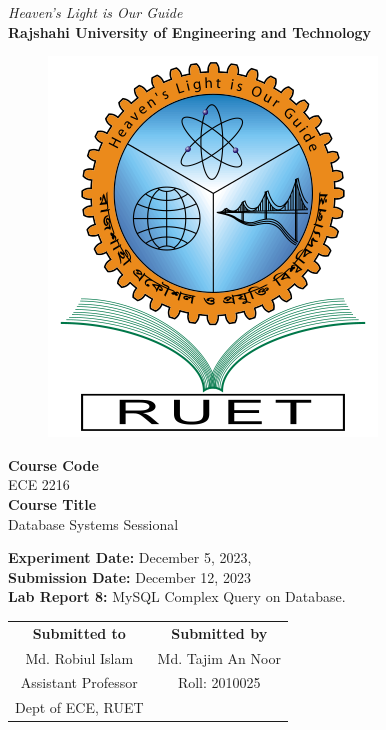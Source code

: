 \vspace*{\fill}
\begin{center}

    \emph{Heaven's Light is Our Guide} \\
    \textbf{Rajshahi University of Engineering and Technology} \\

    \begin{figure}[h]
        \centering
        \includegraphics[scale=.34]{images/RUET_logo.png}
        \label{fig:ruet_logo}
    \end{figure}
    \vspace{5mm}

    \textbf{Course Code}\\
    ECE 2216\\
    \vspace{3mm}
    \textbf{Course Title}\\
    Database Systems Sessional

    \vspace{5mm}
    \textbf{Experiment Date:} December 5, 2023,\\
    \textbf{Submission Date:} December 12, 2023\\

    \vspace{5mm}
    \textbf{Lab Report 8:} MySQL Complex Query on Database.\\

    \vspace{15mm}

    \begin{tabular}{c|c}
        \textbf{Submitted to} & \textbf{Submitted by} \\
        Md. Robiul Islam      & Md. Tajim An Noor     \\
        Assistant Professor   & Roll: 2010025         \\
        Dept of ECE, RUET     &                       \\
    \end{tabular}

\end{center}
\vspace*{\fill}
